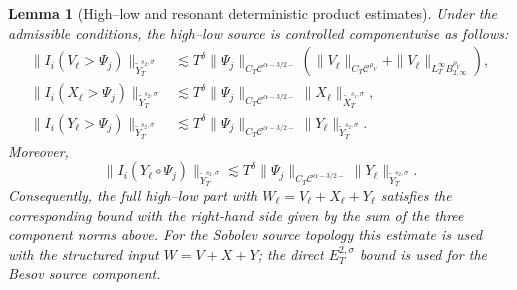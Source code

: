 \documentclass[10pt]{amsart}
\numberwithin{equation}{section}
\theoremstyle{plain}
\newtheorem{lemma}[theorem]{Lemma}
\theoremstyle{definition}
\theoremstyle{remark}
\newcommand{\C}{\mathcal{C}}
\begin{document}
\begin{lemma}[High--low and resonant deterministic product estimates]\label{lem:highlow-resonant-Y}
Under the admissible conditions, the high--low source is controlled componentwise as follows:
\begin{align}
\|I_i(V_\ell>\Psi_j)\|_{\widetilde Y_T^{s_2,\sigma}}
&\lesssim T^\delta
\|\Psi_j\|_{C_T\C^{\alpha-3/2-}}
\left(\|V_\ell\|_{C_T\C^{\rho_V}}+
      \|V_\ell\|_{L_T^\infty B_{2,\infty}^{\rho_V}}\right),
\label{eq:highlow-V-Y-estimate}\\
\|I_i(X_\ell>\Psi_j)\|_{\widetilde Y_T^{s_2,\sigma}}
&\lesssim T^\delta
\|\Psi_j\|_{C_T\C^{\alpha-3/2-}}
\|X_\ell\|_{\widetilde X_T^{s_1,\sigma}},
\label{eq:highlow-X-Y-estimate}\\
\|I_i(Y_\ell>\Psi_j)\|_{\widetilde Y_T^{s_2,\sigma}}
&\lesssim T^\delta
\|\Psi_j\|_{C_T\C^{\alpha-3/2-}}
\|Y_\ell\|_{\widetilde Y_T^{s_2,\sigma}}.
\label{eq:highlow-Y-Y-estimate}
\end{align}
Moreover,
\begin{equation}\label{eq:Y-resonant-estimate}
\|I_i(Y_\ell\circ\Psi_j)\|_{\widetilde Y_T^{s_2,\sigma}}
\lesssim T^\delta
\|\Psi_j\|_{C_T\C^{\alpha-3/2-}}
\|Y_\ell\|_{\widetilde Y_T^{s_2,\sigma}}.
\end{equation}
Consequently, the full high--low part with \(W_\ell=V_\ell+X_\ell+Y_\ell\) satisfies the corresponding bound with the right-hand side given by the sum of the three component norms above.  For the Sobolev source topology this estimate is used with the structured input \(W=V+X+Y\); the direct \(E_T^{2,\sigma}\) bound is used for the Besov source component.
\end{lemma}
\end{document}

